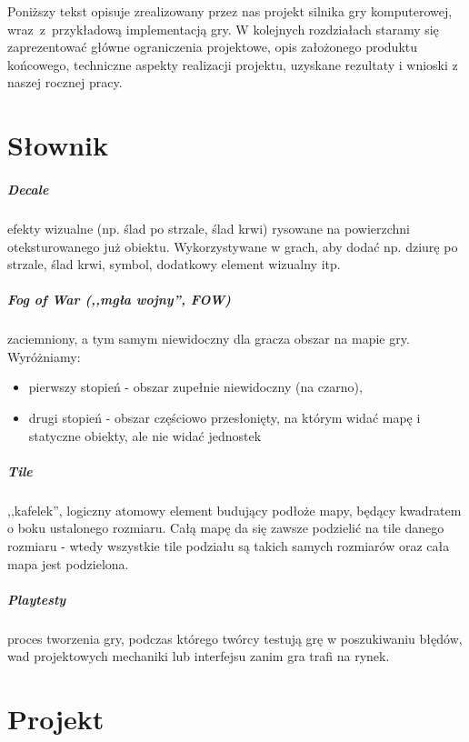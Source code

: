 \documentclass[licencjacka]{pracamgr}
\begin{document}
Poniższy tekst opisuje zrealizowany przez nas projekt silnika gry komputerowej, wraz~z~przykładową implementacją gry. W kolejnych
rozdziałach staramy się zaprezentować główne ograniczenia projektowe, opis założonego produktu końcowego,
techniczne aspekty realizacji projektu, uzyskane rezultaty i wnioski z naszej rocznej pracy.


\chapter{Słownik}
  \paragraph{Decale} efekty wizualne (np. ślad po strzale, ślad krwi) rysowane na powierzchni oteksturowanego już obiektu.
  Wykorzystywane w grach, aby dodać np. dziurę po strzale, ślad krwi, symbol, dodatkowy element wizualny itp.

  \paragraph{Fog of War (,,mgła wojny'', FOW)} zaciemniony, a tym samym niewidoczny dla gracza obszar na mapie gry. Wyróżniamy:
  \begin{itemize}
   \item pierwszy stopień - obszar zupełnie niewidoczny (na czarno),
   \item drugi stopień - obszar częściowo przesłonięty, na którym widać mapę i statyczne obiekty, ale
      nie widać jednostek
  \end{itemize}

  \paragraph{Tile} ,,kafelek'', logiczny atomowy element budujący podłoże mapy, będący kwadratem o boku ustalonego rozmiaru. Całą
  mapę da się zawsze podzielić na tile danego rozmiaru - wtedy wszystkie tile podziału są takich samych rozmiarów oraz
  cała mapa jest podzielona.

  \paragraph{Playtesty} proces tworzenia gry, podczas którego twórcy testują grę w poszukiwaniu błędów,
  wad projektowych mechaniki lub interfejsu zanim gra trafi na rynek.

\chapter{Projekt}
\end{document}
